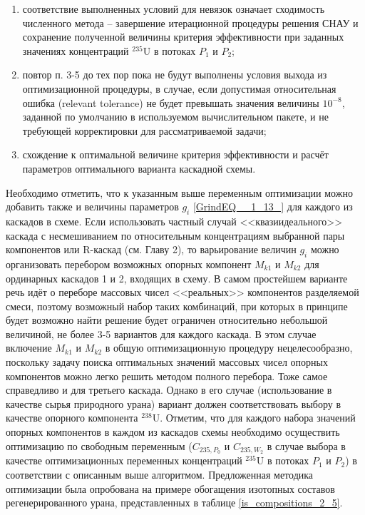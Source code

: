 \begin{enumerate}
    \item соответствие выполненных условий для невязок означает сходимость численного метода -- завершение итерационной процедуры решения СНАУ и сохранение полученной величины критерия эффективности при заданных значениях концентраций $^{235}$U в потоках $P_1$ и $P_2$;
    \item повтор п. 3-5 до тех пор пока не будут выполнены условия выхода из оптимизационной процедуры, в случае, если допустимая относительная ошибка (relevant tolerance) не будет превышать значения  величины $10^{-8}$, заданной по умолчанию в используемом вычислительном пакете, и не требующей корректировки для рассматриваемой задачи;
    \item схождение к оптимальной величине критерия эффективности и расчёт параметров оптимального варианта каскадной схемы.
\end{enumerate}

Необходимо отметить, что к указанным выше переменным оптимизации можно добавить также и величины параметров $g_{i}$  \ref{GrindEQ__1_13_} для каждого из каскадов в схеме.
Если использовать частный случай <<квазиидеального>> каскада с несмешиванием по относительным концентрациям выбранной пары компонентов или R-каскад (см. Главу 2), то варьирование величин $g_{i}$ можно организовать перебором возможных опорных компонент $M_{k1}$ и $M_{k2}$ для ординарных каскадов 1 и 2, входящих в схему. В самом простейшем варианте речь идёт о переборе массовых чисел <<реальных>> компонентов разделяемой смеси, поэтому возможный набор таких комбинаций, при которых в принципе будет возможно найти решение будет ограничен относительно небольшой величиной, не более 3-5 вариантов для каждого каскада. В этом случае включение $M_{k1}$ и $M_{k2}$ в общую оптимизационную процедуру нецелесообразно, поскольку задачу поиска оптимальных значений массовых чисел опорных компонентов можно легко решить методом полного перебора. Тоже самое справедливо и для третьего каскада.
Однако в его случае (использование в качестве сырья природного урана) вариант должен соответствовать выбору в качестве опорного компонента $^{238}$U. Отметим, что для каждого набора значений опорных компонентов в каждом из каскадов схемы необходимо осуществить оптимизацию по свободным переменным ($C_{235,P_0}$ и $C_{235,W_2}$ в случае выбора в качестве оптимизационных переменных концентраций $^{235}$U в потоках $P_1$ и $P_2$) в соответствии с описанным выше алгоритмом. 
Предложенная методика оптимизации была опробована на примере обогащения изотопных составов регенерированного урана, представленных в таблице \ref{is_compositions_2_5}.


